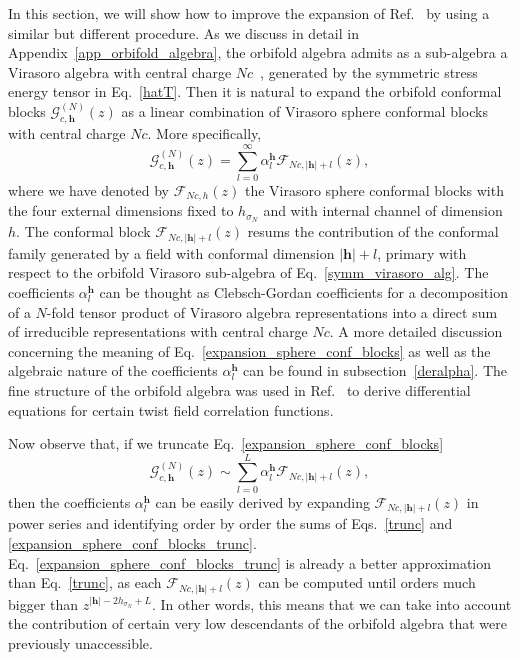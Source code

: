 \documentclass[a4paper,11pt]{article}
\begin{document}
In this section, we will show how to improve the expansion of Ref.~\cite{Collier} by using a similar but different procedure.
As we discuss in detail in Appendix~\ref{app_orbifold_algebra}, the orbifold algebra admits as a sub-algebra a Virasoro algebra with central charge $Nc$~\cite{Borisov}, generated by the symmetric stress energy tensor in Eq.~\eqref{hatT}. Then it is natural to expand the orbifold conformal blocks 
$\mathcal{G}_{c, \boldsymbol{h}}^{(N)}(z)$ as a linear combination of Virasoro sphere conformal blocks with central charge $Nc$. More specifically,
\begin{equation}\label{expansion_sphere_conf_blocks}
 \mathcal{G}_{c, \boldsymbol{h}}^{(N)}(z)=\sum_{l=0}^\infty\alpha_l^{\boldsymbol{h}}\mathcal{F}_{Nc, |\boldsymbol{h}|+l}(z),
\end{equation}
where we have  denoted by $\mathcal{F}_{Nc, h }(z)$ the Virasoro sphere conformal blocks with the four external dimensions fixed to  $h_{\sigma_N}$ and with internal channel of dimension $h$. The conformal block $\mathcal{F}_{Nc, |\boldsymbol{h}|+l}(z)$ resums the 
contribution of the conformal family generated by a field with conformal dimension $|\boldsymbol{h}|+l$, primary with respect to the 
orbifold Virasoro sub-algebra of Eq.~\eqref{symm_virasoro_alg}. The coefficients $\alpha_l^{\boldsymbol{h}}$ can be thought as Clebsch-Gordan coefficients for a 
decomposition of a $N$-fold tensor product of Virasoro algebra representations into a direct sum of irreducible representations with central charge $Nc$. A more detailed discussion concerning the meaning of Eq.~\eqref{expansion_sphere_conf_blocks}  as well as the algebraic nature of the coefficients $\alpha_{l}^{\boldsymbol{h}}$ can be found in subsection~\ref{deralpha}. The fine structure of the orbifold algebra was used in Ref.~\cite{Dupic} to derive differential equations for certain twist field correlation functions.

Now observe that, if we truncate Eq.~\eqref{expansion_sphere_conf_blocks}  
\begin{equation}\label{expansion_sphere_conf_blocks_trunc}
 \mathcal{G}_{c, \boldsymbol{h}}^{(N)}(z)\sim\sum_{l=0}^{L}\alpha_{l}^{\boldsymbol{h}}
 \mathcal{F}_{Nc, |\boldsymbol{h}|+l}(z),
\end{equation}
then the coefficients $\alpha_{l}^{\boldsymbol{h}}$ can be easily derived by expanding $\mathcal{F}_{Nc, |\boldsymbol{h}|+l}(z)$ in power series and identifying order by order the sums of Eqs.~\eqref{trunc} and \eqref{expansion_sphere_conf_blocks_trunc}.
Eq.~\eqref{expansion_sphere_conf_blocks_trunc} is already a better approximation than 
Eq.~\eqref{trunc}, as each  $\mathcal{F}_{Nc, |\boldsymbol{h}|+l}(z)$ can be computed until orders much bigger than $z^{|\boldsymbol{h}|-2h_{\sigma_N}+L}$. In other words, this means that we can take into account the contribution of certain very low descendants of the orbifold algebra that were previously unaccessible.
\end{document}
